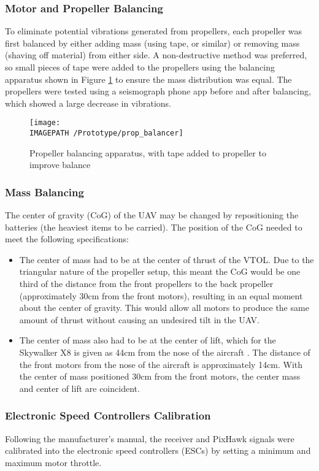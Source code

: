 \subsubsection*{Motor and Propeller Balancing}
To eliminate potential vibrations generated from propellers, each propeller was first balanced by either adding mass (using tape, or similar) or removing mass (shaving off material) from either side. A non-destructive method was preferred, so small pieces of tape were added to the propellers using the balancing apparatus shown in Figure \ref{fig:propbalancing} to ensure the mass distribution was equal. The propellers were tested using a seismograph phone app before and after balancing, which showed a large decrease in vibrations.
\begin{figure}[!ht]
	\centering
	\texttt{[image: \\IMAGEPATH /Prototype/prop\_balancer]}
	\caption{Propeller balancing apparatus, with tape added to propeller to improve balance}
	\label{fig:propbalancing}
\end{figure}

\subsubsection*{Mass Balancing}
The center of gravity (CoG) of the UAV may be changed by repositioning the batteries (the heaviest items to be carried). The position of the CoG needed to meet the following specifications:

\begin{itemize}
	\item The center of mass had to be at the center of thrust of the VTOL. Due to the triangular nature of the propeller setup, this meant the CoG would be one third of the distance from the front propellers to the back propeller (approximately 30cm from the front motors), resulting in an equal moment about the center of gravity. This would allow all motors to produce the same amount of thrust without causing an undesired tilt in the UAV.
	\item The center of mass also had to be at the center of lift, which for the Skywalker X8 is given as 44cm from the nose of the aircraft \cite{ref:x8kit}. The distance of the front motors from the nose of the aircraft is approximately 14cm. With the center of mass positioned 30cm from the front motors, the center mass and center of lift are coincident.
\end{itemize}
	
\subsubsection*{Electronic Speed Controllers Calibration}
Following the manufacturer's manual, the receiver and PixHawk signals were calibrated into the electronic speed controllers (ESCs) by setting a minimum and maximum motor throttle.

